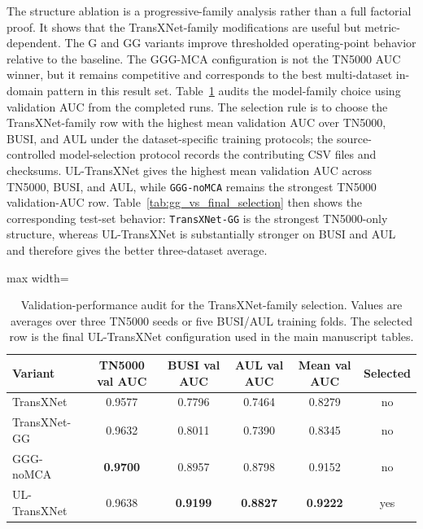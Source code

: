 The structure ablation is a progressive-family analysis rather than a full factorial proof. It shows that the TransXNet-family modifications are useful but metric-dependent. The G and GG variants improve thresholded operating-point behavior relative to the baseline. The GGG-MCA configuration is not the TN5000 AUC winner, but it remains competitive and corresponds to the best multi-dataset in-domain pattern in this result set. Table~\ref{tab:validation_selection_audit} audits the model-family choice using validation AUC from the completed runs. The selection rule is to choose the TransXNet-family row with the highest mean validation AUC over TN5000, BUSI, and AUL under the dataset-specific training protocols; the source-controlled model-selection protocol records the contributing CSV files and checksums. UL-TransXNet gives the highest mean validation AUC across TN5000, BUSI, and AUL, while \texttt{GGG-noMCA} remains the strongest TN5000 validation-AUC row. Table~\ref{tab:gg_vs_final_selection} then shows the corresponding test-set behavior: \texttt{TransXNet-GG} is the strongest TN5000-only structure, whereas UL-TransXNet is substantially stronger on BUSI and AUL and therefore gives the better three-dataset average.

\begin{table}[t]
    \centering
    \small
    \caption{Validation-performance audit for the TransXNet-family selection. Values are averages over three TN5000 seeds or five BUSI/AUL training folds. The selected row is the final UL-TransXNet configuration used in the main manuscript tables.}
    \label{tab:validation_selection_audit}
    \begin{adjustbox}{max width=\columnwidth}
    \begin{tabular}{lccccc}
        \toprule
        Variant & TN5000 val AUC & BUSI val AUC & AUL val AUC & Mean val AUC & Selected \\
        \midrule
        TransXNet & 0.9577 & 0.7796 & 0.7464 & 0.8279 & no \\
        TransXNet-GG & 0.9632 & 0.8011 & 0.7390 & 0.8345 & no \\
        GGG-noMCA & \textbf{0.9700} & 0.8957 & 0.8798 & 0.9152 & no \\
        UL-TransXNet & 0.9638 & \textbf{0.9199} & \textbf{0.8827} & \textbf{0.9222} & yes \\
        \bottomrule
    \end{tabular}
    \end{adjustbox}
\end{table}

